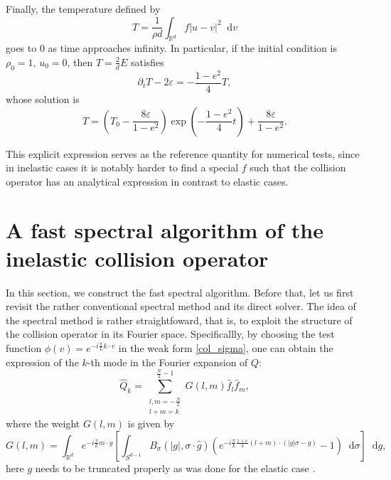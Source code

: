 \documentclass[review, times]{elsarticle}
\newcommand*\diff{\mathop{}\!\mathrm{d}}
\begin{document}
Finally, the temperature defined by
\begin{equation}
  T = \frac{1}{\rho d}\int_{\mathbb{R}^d}f|u - v|^2\diff v
\end{equation}
goes to $0$ as time approaches infinity. In particular, if the initial condition is $\rho_0=1$, $u_0=0$, then $T=\frac{2}{d}E$ satisfies
\begin{equation}
\partial_t T-2\varepsilon =-\frac{1-e^2}{4}T,
\end{equation}
whose solution is
\begin{equation}\label{soln:T}
T=\left(T_0-\frac{8\varepsilon}{1-e^2}\right)\exp{\left(-\frac{1-e^2}{4}t\right)}+\frac{8\varepsilon}{1-e^2}.
\end{equation}
\begin{rmk}
This explicit expression serves as the reference quantity for numerical tests, since in inelastic cases it is notably harder to find a special $f$ such that the collision operator has an analytical expression in contrast to elastic cases.
\end{rmk}

\section{A fast spectral algorithm of the inelastic collision operator}

In this section, we construct the fast spectral algorithm. Before that, let us first revisit the rather conventional spectral method and its direct solver. The idea of the spectral method is rather straightfoward, that is, to exploit the structure of the collision operator in its Fourier space. Specificallly, by choosing the test function $\phi(v)=e^{-i\frac{\pi}{L}k\cdot v}$ in the weak form \eqref{col_sigma}, one can obtain the expression of the $k$-th mode in the Fourier expansion of $Q$:
\begin{equation} \label{sum1}
\hat{Q}_k=\sum_{\substack{l,m=-\frac{N}{2}\\l+m=k}}^{\frac{N}{2}-1}G(l,m)\hat{f}_l\hat{f}_m,
\end{equation} 
where the weight $G(l,m)$ is given by
\begin{equation*}  \label{G}
G(l,m)=\int_{\mathbb{R}^d}e^{-i\frac{\pi}{L}m \cdot g}\left[\int_{S^{d-1}}B_{\sigma}(|g|,\sigma\cdot \hat{g})\left(e^{-i\frac{\pi}{L}\frac{1+e}{4}(l+m)\cdot (|g|\sigma-g)}-1\right)\diff{\sigma}\right]\diff{g},
\end{equation*}
here $g$ needs to be truncated properly as was done for the elastic case \cite{gamba_hu}. 
\end{document}
